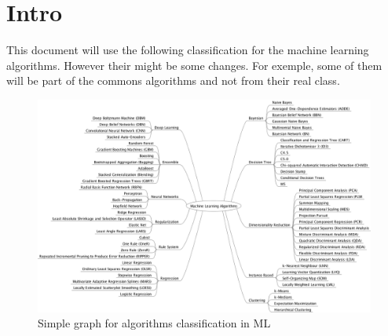 
\chapter*{Intro} %
\label{cha:intro}

This document will use the following classification for the machine learning algorithms. However their might be some changes. For exemple, some of them will be part of the commons algorithms and not from their real class. 

\begin{figure}[ht]
\centering
\includegraphics[scale=0.4]{figures/MachineLearningAlgorithms}
\caption{Simple graph for algorithms classification in ML}
\end{figure}


